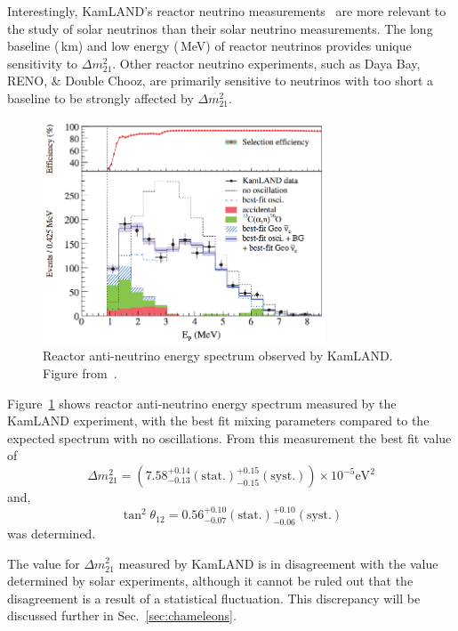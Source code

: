 Interestingly, KamLAND's reactor neutrino measurements~\citep{kamland_reactor} are
more relevant to the study of solar neutrinos than their solar neutrino measurements.
The long baseline (\,km) and low energy (\,MeV) of reactor neutrinos provides
unique sensitivity to $\Delta m^{2}_{21}$.
Other reactor neutrino experiments, such as Daya Bay, RENO, \& Double Chooz,
are primarily sensitive to neutrinos with too short a baseline to be strongly
affected by $\Delta m^{2}_{21}$.

\begin{figure}[htbp]
  \centering
  \includegraphics[width=0.75\textwidth]{kamland_reactor_spectrum}
  \caption[Kamland Reactor Spectrum]{Reactor anti-neutrino energy spectrum observed by KamLAND.
                                    Figure from~\citep{kamland_reactor}.}
  \label{fig:kamland_reactor}
\end{figure}

Figure~\ref{fig:kamland_reactor} shows reactor anti-neutrino energy spectrum measured
by the KamLAND experiment, with the best fit mixing parameters compared to the
expected spectrum with no oscillations.
From this measurement the best fit value of 
\begin{equation*}
    \Delta m^{2}_{21} = (7.58^{+0.14}_{-0.13}(\mathrm{stat.})^{+0.15}_{-0.15}(\mathrm{syst.}))\times 10^{-5}\text{eV}^{2}
\end{equation*}
and,
\begin{equation*}
\tan^{2} \theta_{12} = 0.56^{+0.10}_{-0.07}(\mathrm{stat.})^{+0.10}_{-0.06}(\mathrm{syst.})
\end{equation*}
was determined.

The value for $\Delta m^{2}_{21}$ measured by KamLAND is in disagreement with
the value determined by solar experiments, although it cannot be ruled out that
the disagreement is a result of a statistical fluctuation. This discrepancy
will be discussed further in Sec.~\ref{sec:chameleons}.
